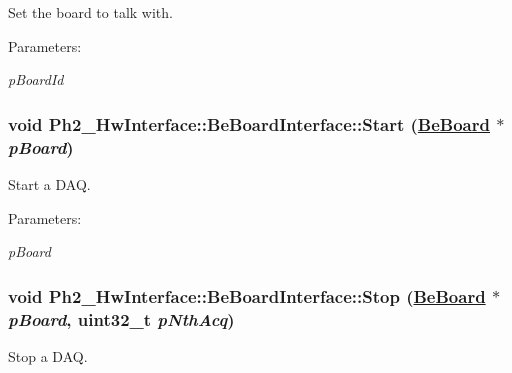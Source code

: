 Set the board to talk with. 

\begin{Desc}
\item[Parameters:]
\begin{description}
\item[{\em p\-Board\-Id}]\end{description}
\end{Desc}
\hypertarget{class_ph2___hw_interface_1_1_be_board_interface_c78a16fd4779f86c1224b09d30349e18}{
\subsubsection[Start]{\setlength{\rightskip}{0pt plus 5cm}void Ph2\_\-Hw\-Interface::Be\-Board\-Interface::Start (\hyperlink{class_ph2___hw_description_1_1_be_board}{Be\-Board} $\ast$ {\em p\-Board})}}
\label{class_ph2___hw_interface_1_1_be_board_interface_c78a16fd4779f86c1224b09d30349e18}


Start a DAQ. 

\begin{Desc}
\item[Parameters:]
\begin{description}
\item[{\em p\-Board}]\end{description}
\end{Desc}
\hypertarget{class_ph2___hw_interface_1_1_be_board_interface_08d0374efe31d8078f8d31f58b709e6f}{
\subsubsection[Stop]{\setlength{\rightskip}{0pt plus 5cm}void Ph2\_\-Hw\-Interface::Be\-Board\-Interface::Stop (\hyperlink{class_ph2___hw_description_1_1_be_board}{Be\-Board} $\ast$ {\em p\-Board}, uint32\_\-t {\em p\-Nth\-Acq})}}
\label{class_ph2___hw_interface_1_1_be_board_interface_08d0374efe31d8078f8d31f58b709e6f}


Stop a DAQ. 

